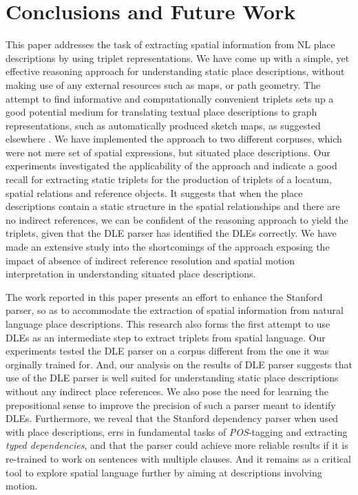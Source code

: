 \documentclass{sig-alternate}
\begin{document}
\section{Conclusions and Future Work}
\label{sec:conclusion}
This paper addresses the task of extracting spatial information from NL place descriptions by using triplet representations. We have come up with a simple, yet effective reasoning approach for understanding static place descriptions, without making use of any external resources such as maps, or path geometry. The attempt to find informative and computationally convenient triplets sets up a good potential medium for translating textual place descriptions to graph representations, such as automatically produced sketch maps, as suggested elsewhere \cite{maria:descriptions}. We have implemented the approach to two different corpuses, which were not mere set of spatial expressions, but situated place descriptions. Our experiments investigated the applicability of the approach and indicate a good recall for extracting static triplets for the production of triplets of a locatum, spatial relations and reference objects. It suggests that when the place descriptions contain a static structure in the spatial relationships and there are no indirect references, we can be confident of the reasoning approach to yield the triplets, given that the DLE parser has identified the DLEs correctly. We have made an extensive study into the shortcomings of the approach exposing the impact of absence of indirect reference resolution and spatial motion interpretation in understanding situated place descriptions. 

The work reported in this paper presents an effort to enhance the Stanford parser, so as to accommodate the extraction of spatial information from natural language place descriptions.
This research also forms the first attempt to use DLEs as an intermediate step to extract triplets from spatial language. Our experiments tested the DLE parser on a corpus different from the one it was orginally trained for. And, our analysis on the results of DLE parser suggests that use of the DLE parser is well suited for understanding static place descriptions without any indirect place references. We also pose the need for learning the prepositional sense to improve the precision of such a parser meant to identify DLEs. Furthermore, we reveal that the Stanford dependency parser when used with place descriptions, errs in fundamental tasks of \textit{POS}-tagging and extracting \textit{typed dependencies}, and that the parser could achieve more reliable results if it is re-trained to work on sentences with multiple clauses. And it remains as a critical tool to explore spatial language further by aiming at descriptions involving motion.
\end{document}
